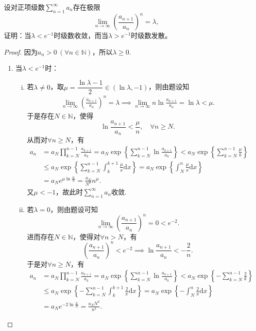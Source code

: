 \documentclass[../../main.tex]{subfiles}%
\begin{document}
\begin{example}[Frink判别法]

设对正项级数$\sum\limits_{n=1}^{\infty} a_n$存在极限
$$\lim_{n\to\infty} \left( \frac{a_{n+1}}{a_n} \right)^n = \lambda,$$
证明：当$\lambda < e^{-1}$时级数收敛，而当$\lambda > e^{-1}$时级数发散。
\end{example}
\begin{proof}

因为$a_n>0\ (\forall n\in\mathbb{N})$，所以$\lambda\geqslant 0$.

\begin{enumerate}[(1)]
\item 当$\lambda < e^{-1}$时：
\begin{enumerate}[(i)]
\item 若$\lambda \ne 0$，取$\mu = \dfrac{\ln\lambda - 1}{2} \in (\ln\lambda, -1)$，则由题设知
\begin{align*}
\lim_{n\to\infty} \left( \frac{a_{n+1}}{a_n} \right)^n = \lambda \implies \lim_{n\to\infty} n\ln\frac{a_{n+1}}{a_n} = \ln\lambda < \mu.
\end{align*}
于是存在$N\in\mathbb{N}$，使得
$$\ln\frac{a_{n+1}}{a_n} < \frac{\mu}{n}, \quad \forall n\geqslant N.$$
从而对$\forall n\geqslant N$，有
\begin{align*}
a_n &= a_N \prod_{k=N}^{n-1} \frac{a_{k+1}}{a_k} = a_N \exp\left\{ \sum_{k=N}^{n-1} \ln\frac{a_{k+1}}{a_k} \right\} < a_N \exp\left\{ \sum_{k=N}^{n-1} \frac{\mu}{k} \right\} \\
&\leqslant a_N \exp\left\{ \sum_{k=N}^{n-1} \int_k^{k+1} \frac{\mu}{x} \mathrm{d}x \right\} = a_N \exp\left\{ \int_N^n \frac{\mu}{x} \mathrm{d}x \right\} \\
&= a_N e^{\mu\ln\frac{n}{N}} = \frac{a_N}{N^\mu} n^\mu.
\end{align*}
又$\mu < -1$，故此时$\sum\limits_{n=1}^{\infty} a_n$收敛.

\item 若$\lambda = 0$，则由题设可知
$$\lim_{n\to\infty} \left( \frac{a_{n+1}}{a_n} \right)^n = 0 < e^{-2}.$$
进而存在$N\in\mathbb{N}$，使得对$\forall n>N$，有
$$\left( \frac{a_{n+1}}{a_n} \right)^n < e^{-2} \implies \ln\frac{a_{n+1}}{a_n} < -\frac{2}{n}.$$
于是对$\forall n\geqslant N$，有
\begin{align*}
a_n &= a_N \prod_{k=N}^{n-1} \frac{a_{k+1}}{a_k} = a_N \exp\left\{ \sum_{k=N}^{n-1} \ln\frac{a_{k+1}}{a_k} \right\} < a_N \exp\left\{ -\sum_{k=N}^{n-1} \frac{2}{k} \right\} \\
&\leqslant a_N \exp\left\{ -\sum_{k=N}^{n-1} \int_k^{k+1} \frac{2}{x} \mathrm{d}x \right\} = a_N \exp\left\{ -\int_N^n \frac{2}{x} \mathrm{d}x \right\} \\
&= a_N e^{-2\ln\frac{n}{N}} = \frac{a_N N^2}{n^2}.
\end{align*}
\end{enumerate}


\end{enumerate}
\end{proof}
\end{document}
